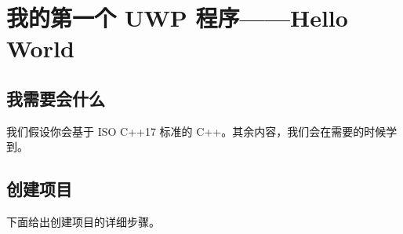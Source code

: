 




\section{我的第一个 UWP 程序——Hello World}

\subsection{我需要会什么}

我们假设你会基于 ISO C++17 标准的 C++。其余内容，我们会在需要的时候学到。

\subsection{创建项目}

下面给出创建项目的详细步骤。

